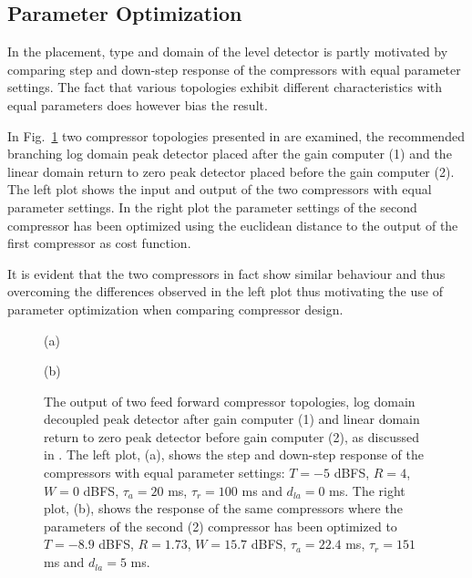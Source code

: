 \documentclass[../main2.tex]{subfiles}
\providecommand{\rootdir}{..}
\begin{document}
\subsection{Parameter Optimization}
In \cite{reiss2012tutorial} the placement, type and domain of the level detector is partly motivated by comparing step and down-step response of the compressors with equal parameter settings. The fact that various topologies exhibit different characteristics with equal parameters does however bias the result. 

In Fig.~\ref{fig:param_opt} two compressor topologies presented in \cite{reiss2012} are examined, the recommended branching log domain peak detector placed after the gain computer (1) and the linear domain return to zero peak detector placed before the gain computer (2). The left plot shows the input and output of the two compressors with equal parameter settings. In the right plot the parameter settings of the second compressor has been optimized using the euclidean distance to the output of the first compressor as cost function. 

It is evident that the two compressors in fact show similar behaviour and thus overcoming the differences observed in the left plot thus motivating the use of parameter optimization when comparing compressor design.
\begin{figure}[ht]
\captionsetup*{justification=centering}
\begin{minipage}[t]{.5\textwidth}
 \centering

\caption*{(a)} 
\label{fig:comp_input}
\end{minipage}%
\begin{minipage}[t]{.5\textwidth}
\centering

\caption*{(b)} 
\end{minipage}
\caption{The output of two feed forward compressor topologies, log domain decoupled peak detector after gain computer (1) and linear domain return to zero peak detector before gain computer (2), as discussed in \cite{reiss2012tutorial}. The left plot, (a), shows the step and down-step response of the compressors with equal parameter settings: $T = -5$ dBFS, $R=4$, $W=0$ dBFS, $\tau_a = 20$ ms, $\tau_r = 100$ ms and $d_{la}=0$ ms. The right plot, (b), shows the response of the same compressors where the parameters of the second (2) compressor has been optimized to $T = -8.9$ dBFS, $R=1.73$, $W=15.7$ dBFS, $\tau_a = 22.4$ ms, $\tau_r = 151$ ms and $d_{la}=5$ ms.}
\label{fig:param_opt}
\end{figure}
\end{document}
